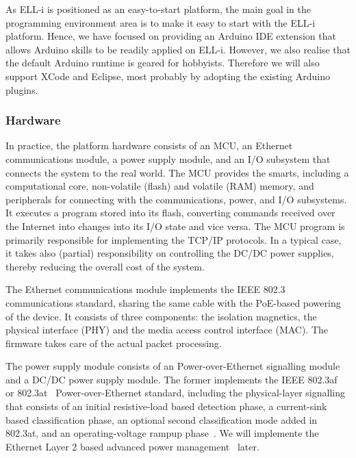 \documentclass[final]{siamltex}
\begin{document}
As ELL-i is positioned as an easy-to-start platform, the main goal in
the programming environment area is to make it easy to start with the
ELL-i platform.  Hence, we have focused on providing an Arduino IDE
extension that allows Arduino skills to be readily applied on ELL-i.
However, we also realise that the default Arduino runtime is geared
for hobbyists.  Therefore we will also support XCode and Eclipse, most
probably by adopting the existing Arduino plugins.

\subsubsection{Hardware}

In practice, the platform hardware consists of an MCU, an Ethernet
communications module, a power supply module, and an I/O subsystem
that connects the system to the real world.  The MCU provides the
smarts, including a computational core, non-volatile (flash) and
volatile (RAM) memory, and peripherals for connecting with the
communications, power, and I/O subsystems.  It executes a program
stored into its flash, converting commands received over the Internet
into changes into its I/O state and vice versa.  The MCU program is
primarily responsible for implementing the TCP/IP protocols.  In a
typical case, it takes also (partial) responsibility on controlling
the DC/DC power supplies, thereby reducing the overall cost of the
system.

The Ethernet communications module implements the IEEE 802.3~\cite{802.3}
communications standard, sharing the same cable with the PoE-based
powering of the device.  It consists of three components: the
isolation magnetics, the physical interface (PHY) and the media access
control interface (MAC).  The firmware takes care of the actual packet
processing.

The power supply module consists of an Power-over-Ethernet signalling
module and a DC/DC power supply module.  The former implements the
IEEE 802.3af~\cite{802.3af} or 802.3at~\cite{802.3at}
Power-over-Ethernet standard, including the physical-layer signalling
that consists of an initial resistive-load based detection phase, a
current-sink based classification phase, an optional second
classification mode added in 802.3at, and an operating-voltage rampup
phase~\cite{802.3at}.  We will implemente the Ethernet Layer 2
based advanced power management~\cite{802.3at} later.
\end{document}

